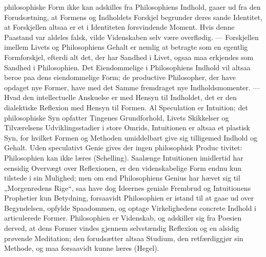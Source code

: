 \documentclass[12pt]{book}
\newcommand{\opage}[1]{\marginnote{\footnotesize\textit{[#1]}}}
\begin{document}
philosophiske Form ikke kan adskilles fra Philosophiens Indhold, gaaer ud fra den
Forudsætning, at Formens og Indholdets Forskjel begrunder deres sande Identitet, at
Forskjellen altsaa er et i Identiteten forsvindende Moment. Hvis denne Paastand var
aldeles falsk, vilde Videnskaben selv være overflødig. --- Forskjellen imellem Livets
og Philosophiens Gehalt er nemlig at betragte som en egentlig Formforskjel, efterdi
alt det, der har Sandhed i Livet, ogsaa maa erkjendes som Sandhed i Philosophien. Det
Eiendommelige i Philosophiens Indhold vil altsaa beroe paa dens eiendommelige Form;
de productive Philosopher, der have opdaget nye Former, have med det Samme
fremdraget nye Indholdsmomenter. --- Hvad den intellectuelle Anskuelse er med Hensyn
til Indholdet, det er den dialektiske Reflexion med Hensyn til Formen. Al Speculation
er Intuition; det philosophiske Syn opfatter Tingenes Grundforhold, Livets Skikkelser
og Tilværelsens Udviklingsstadier i store Omrids, Intuitionen er altsaa et plastisk
Syn, for hvilket Formen og Methoden umiddelbart give sig tilligemed Indhold og
Gehalt. Uden speculativt Genie gives der ingen philosophisk Produc%
\opage{95}%
tivitet: Philosophien kan ikke læres (Schelling). Saalænge Intuitionen imidlertid har
eensidig Overvægt over Reflexionen, er den videnskabelige Form endnu kun tilstede i
sin Mulighed; men om end Philosophiens Genius har hævet sig til „Morgenrødens Rige“,
saa have dog Ideernes geniale Frembrud og Intuitionens Prophetier kun Betydning,
forsaavidt Philosophien er istand til at gaae ud over Begyndelsen, opfylde
Spaadommen, og optage Virkelighedens concrete Indhold i articulerede Former.
Philosophien er Videnskab, og adskiller sig fra Poesien derved, at dens Former vindes
gjennem selvstændig Reflexion og en alsidig prøvende Meditation; den forudsætter
altsaa Studium, den retfærdiggjør sin Methode, og maa forsaavidt kunne læres (Hegel).
\end{document}
